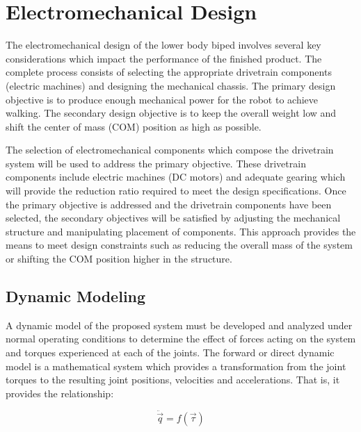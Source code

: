 \chapter{Electromechanical Design} %
\label{cha:design}
The electromechanical design of the lower body biped involves several key considerations which impact the performance of the finished product. The complete process consists of selecting the appropriate drivetrain components (electric machines) and designing the mechanical chassis. The primary design objective is to produce enough mechanical power for the robot to achieve walking. The secondary design objective is to keep the overall weight low and shift the center of mass (COM) position as high as possible. 

The selection of electromechanical components which compose the drivetrain system will be used to address the primary objective. These drivetrain components include electric machines (DC motors) and adequate gearing which will provide the reduction ratio required to meet the design specifications. Once the primary objective is addressed and the drivetrain components have been selected, the secondary objectives will be satisfied by adjusting the mechanical structure and manipulating placement of components. This approach provides the means to meet design constraints such as reducing the overall mass of the system or shifting the COM position higher in the structure.


\section{Dynamic Modeling} %
\label{sec:chassis}

A dynamic model of the proposed system must be developed and analyzed under normal operating conditions to determine the effect of forces acting on the system and torques experienced at each of the joints. The forward or direct dynamic model is a mathematical system which provides a transformation from the joint torques to the resulting joint positions, velocities and accelerations. That is, it provides the relationship:

\begin{equation}
	\ddot{\vec{q}} = f(\vec{\tau})
\end{equation}

